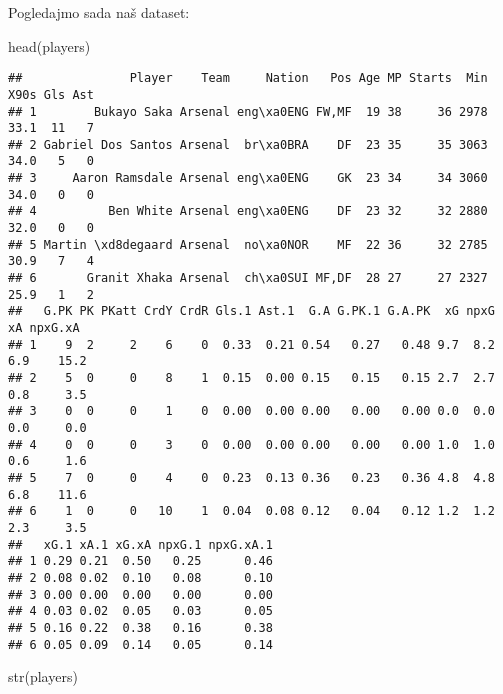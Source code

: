 \documentclass[
]{article}
\newenvironment{Shaded}{\begin{snugshade}}{\end{snugshade}}
\newcommand{\FunctionTok}[1]{\textcolor[rgb]{0.00,0.00,0.00}{#1}}
\newcommand{\NormalTok}[1]{#1}
\begin{document}
Pogledajmo sada naš dataset:

\begin{Shaded}
\begin{Highlighting}[]
\FunctionTok{head}\NormalTok{(players)}
\end{Highlighting}
\end{Shaded}

\begin{verbatim}
##               Player    Team     Nation   Pos Age MP Starts  Min X90s Gls Ast
## 1        Bukayo Saka Arsenal eng\xa0ENG FW,MF  19 38     36 2978 33.1  11   7
## 2 Gabriel Dos Santos Arsenal  br\xa0BRA    DF  23 35     35 3063 34.0   5   0
## 3     Aaron Ramsdale Arsenal eng\xa0ENG    GK  23 34     34 3060 34.0   0   0
## 4          Ben White Arsenal eng\xa0ENG    DF  23 32     32 2880 32.0   0   0
## 5 Martin \xd8degaard Arsenal  no\xa0NOR    MF  22 36     32 2785 30.9   7   4
## 6       Granit Xhaka Arsenal  ch\xa0SUI MF,DF  28 27     27 2327 25.9   1   2
##   G.PK PK PKatt CrdY CrdR Gls.1 Ast.1  G.A G.PK.1 G.A.PK  xG npxG  xA npxG.xA
## 1    9  2     2    6    0  0.33  0.21 0.54   0.27   0.48 9.7  8.2 6.9    15.2
## 2    5  0     0    8    1  0.15  0.00 0.15   0.15   0.15 2.7  2.7 0.8     3.5
## 3    0  0     0    1    0  0.00  0.00 0.00   0.00   0.00 0.0  0.0 0.0     0.0
## 4    0  0     0    3    0  0.00  0.00 0.00   0.00   0.00 1.0  1.0 0.6     1.6
## 5    7  0     0    4    0  0.23  0.13 0.36   0.23   0.36 4.8  4.8 6.8    11.6
## 6    1  0     0   10    1  0.04  0.08 0.12   0.04   0.12 1.2  1.2 2.3     3.5
##   xG.1 xA.1 xG.xA npxG.1 npxG.xA.1
## 1 0.29 0.21  0.50   0.25      0.46
## 2 0.08 0.02  0.10   0.08      0.10
## 3 0.00 0.00  0.00   0.00      0.00
## 4 0.03 0.02  0.05   0.03      0.05
## 5 0.16 0.22  0.38   0.16      0.38
## 6 0.05 0.09  0.14   0.05      0.14
\end{verbatim}

\begin{Shaded}
\begin{Highlighting}[]
\FunctionTok{str}\NormalTok{(players)}
\end{Highlighting}
\end{Shaded}
\end{document}
